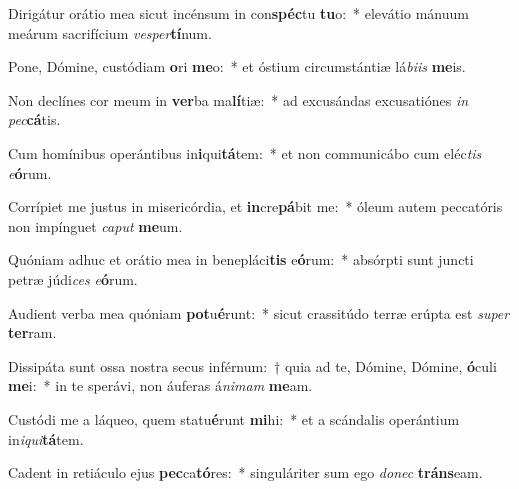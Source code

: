 \item Dirigátur orátio mea sicut incénsum in con\textbf{spéc}tu \textbf{tu}o:~* elevátio mánuum meárum sacrifícium \textit{ves}\textit{per}\textbf{tí}num.
\item Pone, Dómine, custódiam \textbf{o}ri \textbf{me}o:~* et óstium circumstántiæ lá\textit{bi}\textit{is} \textbf{me}is.
\item Non declínes cor meum in \textbf{ver}ba ma\textbf{lí}tiæ:~* ad excusándas excusatiónes \textit{in} \textit{pec}\textbf{cá}tis.
\item Cum homínibus operántibus in\textbf{i}qui\textbf{tá}tem:~* et non communicábo cum eléc\textit{tis} \textit{e}\textbf{ó}rum.
\item Corrípiet me justus in misericórdia, et \textbf{in}cre\textbf{pá}bit me:~* óleum autem peccatóris non impínguet \textit{ca}\textit{put} \textbf{me}um.
\item Quóniam adhuc et orátio mea in benepláci\textbf{tis} e\textbf{ó}rum:~* absórpti sunt juncti petræ júdi\textit{ces} \textit{e}\textbf{ó}rum.
\item Audient verba mea quóniam \textbf{pot}u\textbf{é}runt:~* sicut crassitúdo terræ erúpta est \textit{su}\textit{per} \textbf{ter}ram.
\item Dissipáta sunt ossa nostra secus inférnum:~† quia ad te, Dómine, Dómine, \textbf{ó}culi \textbf{me}i:~* in te sperávi, non áuferas á\textit{ni}\textit{mam} \textbf{me}am.
\item Custódi me a láqueo, quem statu\textbf{é}runt \textbf{mi}hi:~* et a scándalis operántium in\textit{i}\textit{qui}\textbf{tá}tem.
\item Cadent in retiáculo ejus \textbf{pec}ca\textbf{tó}res:~* singuláriter sum ego \textit{do}\textit{nec} \textbf{tráns}eam.
